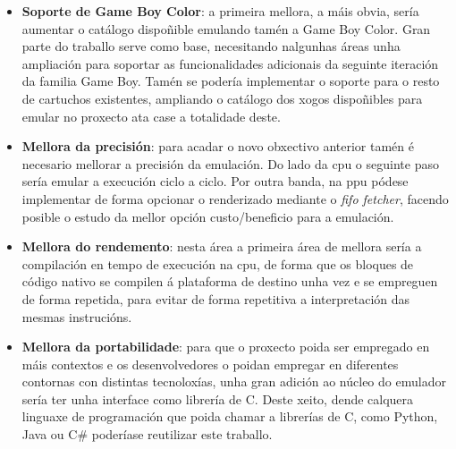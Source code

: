 \begin{itemize}
  \item \textbf{Soporte de Game Boy Color}: a primeira mellora, a máis obvia, sería aumentar o catálogo dispoñible emulando tamén a Game Boy Color. Gran parte do traballo
  serve como base, necesitando nalgunhas áreas unha ampliación para soportar as funcionalidades adicionais da seguinte iteración da familia Game Boy.
  Tamén se podería implementar o soporte para o resto de cartuchos existentes, ampliando o catálogo dos xogos dispoñibles para emular no proxecto
  ata case a totalidade deste.

  \item \textbf{Mellora da precisión}: para acadar o novo obxectivo anterior tamén é necesario mellorar a precisión da emulación. Do lado da \acrshort{cpu}
  o seguinte paso sería emular a execución ciclo a ciclo. Por outra banda, na \acrshort{ppu} pódese implementar de forma opcionar o renderizado
  mediante o \textit{fifo fetcher}, facendo posible o estudo da mellor opción custo/beneficio para a emulación.

  \item \textbf{Mellora do rendemento}: nesta área a primeira área de mellora sería a compilación en tempo de execución na \acrshort{cpu},
  de forma que os bloques de código nativo se compilen á plataforma de destino unha vez e se empreguen de forma repetida, para evitar de forma
  repetitiva a interpretación das mesmas instrucións.

  \item \textbf{Mellora da portabilidade}: para que o proxecto poida ser empregado en máis contextos e os desenvolvedores o poidan empregar en diferentes
  contornas con distintas tecnoloxías, unha gran adición ao núcleo do emulador sería ter unha interface como librería de C. Deste xeito, dende calquera
  linguaxe de programación que poida chamar a librerías de C, como Python, Java ou C\# poderíase reutilizar este traballo.
\end{itemize}




